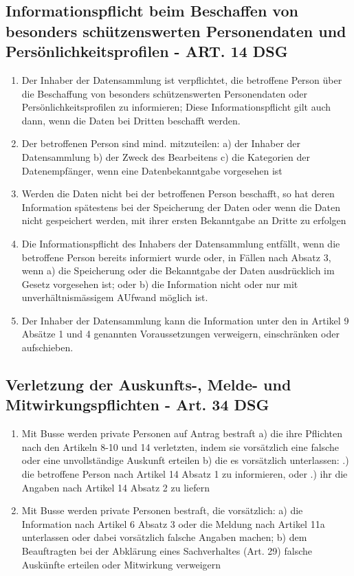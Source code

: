 \documentclass{report}
\theoremstyle{definition}
\theoremstyle{example}
\begin{document}
\subsection{Informationspflicht beim Beschaffen von besonders schützenswerten Personendaten und Persönlichkeitsprofilen - ART. 14 DSG}
\begin{enumerate}
   \item Der Inhaber der Datensammlung ist verpflichtet, die betroffene Person über die Beschaffung von besonders schützenswerten Personendaten oder Persönlichkeitsprofilen zu informieren; Diese Informationspflicht gilt auch dann, wenn die Daten bei Dritten beschafft werden.
   \item Der betroffenen Person sind mind. mitzuteilen:
   \subitem a) der Inhaber der Datensammlung
   \subitem b) der Zweck des Bearbeitens
   \subitem c) die Kategorien der Datenempfänger, wenn eine Datenbekanntgabe vorgesehen ist
   \item Werden die Daten nicht bei der betroffenen Person beschafft, so hat deren Information spätestens bei der Speicherung der Daten oder wenn die Daten nicht gespeichert werden, mit ihrer ersten Bekanntgabe an Dritte zu erfolgen
   \item Die Informationspflicht des Inhabers der Datensammlung entfällt, wenn die betroffene Person bereits informiert wurde oder, in Fällen nach Absatz 3, wenn
   \subitem a) die Speicherung oder die Bekanntgabe der Daten ausdrücklich im Gesetz vorgesehen ist; oder
   \subitem b) die Information nicht oder nur mit unverhältnismässigem AUfwand möglich ist.
   \item Der Inhaber der Datensammlung kann die Information unter den in Artikel 9 Absätze 1 und 4 genannten Voraussetzungen verweigern, einschränken oder aufschieben.  
\end{enumerate}

\subsection{Verletzung der Auskunfts-, Melde- und Mitwirkungspflichten - Art. 34 DSG}
\begin{enumerate}
   \item Mit Busse werden private Personen auf Antrag bestraft
   \subitem a) die ihre Pflichten nach den Artikeln 8-10 und 14 verletzten, indem sie vorsätzlich eine falsche oder eine unvollständige Auskunft erteilen
   \subitem b) die es vorsätzlich unterlassen:
   .) die betroffene Person nach Artikel 14 Absatz 1 zu informieren, oder
   .) ihr die Angaben nach Artikel 14 Absatz 2 zu liefern
   \item Mit Busse werden private Personen bestraft, die vorsätzlich:
   \subitem a) die Information nach Artikel 6 Absatz 3 oder die Meldung nach Artikel 11a unterlassen oder dabei vorsätzlich falsche Angaben machen;
   \subitem b) dem Beauftragten bei der Abklärung eines Sachverhaltes (Art. 29) falsche Auskünfte erteilen oder Mitwirkung verweigern
\end{enumerate}
\end{document}
